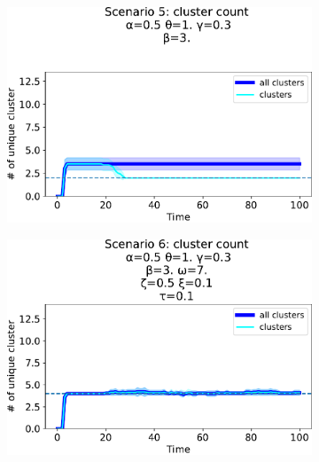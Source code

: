 \begin{figure}[t]
\begin{subfigure}[b]{0.32\textwidth}
    \includegraphics[width=\textwidth]{papers/swarm-intelligence2021/img/simulations/non-convex_0_021_α-0.5_θ-1._γ-0.3_β-3._ω-0._ζ-0..pdf}
  \end{subfigure}
  \hfill
  \centering
  \begin{subfigure}[b]{0.32\textwidth}
    \centering
    \includegraphics[width=\textwidth]{papers/swarm-intelligence2021/img/simulations/movement_cluster_count.pdf}
  \end{subfigure}
  \centering
  \begin{subfigure}[b]{0.32\textwidth}
    \centering

\end{subfigure}
\end{figure}
